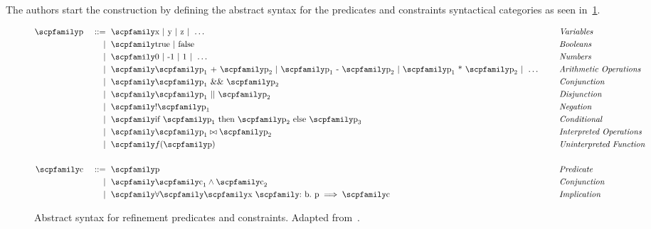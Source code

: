 \documentclass[
  oneside,
  english,
  coorientadorbanca,
  noabntexcite
]{ufsc-thesis-rn46-2019}
\def\bnfdef{::=}
\newcommand{\codett}[1]{\text{\scpfamily#1}}
\newcommand{\code}[1]{\text{\scpfamily\setlength\spaceskip{0.35em}#1}}
\newcommand{\bnfmore}[1]{            & \ & \mid{}    & \ \code{#1}}
\newcommand{\astprod}[2]{\code{#1} & \ & \bnfdef{} & \ \code{#2}}
\newcommand{\astmore}[1]{\bnfmore{#1}}
\newcommand{\typer}[2]{\code{#1 \codett{:} #2}}
\begin{document}
The authors start the construction by defining the abstract syntax for the predicates and constraints syntactical categories as seen in~\cref{fig:refinement_predicates}.
\begin{figure}[ht]
  \begin{minipage}{\textwidth}
    \begin{alignat*}{4}
      \astprod{p}{x $\mid$ y $\mid$ z $\mid\ \dots$} & \quad & \textit{Variables}              \\
      \astmore{true $\mid$ false}                    & \quad & \textit{Booleans}               \\
      \astmore{0 $\mid$ -1 $\mid$ 1 $\mid\ \dots$ }  & \quad & \textit{Numbers}                \\
      \astmore{%
        $\code{p}_1$ + $\code{p}_2$
        $\mid$ $\code{p}_1$ - $\code{p}_2$
        $\mid$ $\code{p}_1$ * $\code{p}_2$
        $\mid\ \dots$
      }                                              & \quad & \textit{Arithmetic Operations}  \\
      \astmore{$\code{p}_1$ \&\& $\code{p}_2$}       & \quad & \textit{Conjunction}            \\
      \astmore{$\code{p}_1$ || $\code{p}_2$}         & \quad & \textit{Disjunction}            \\
      \astmore{!$\code{p}_1$}                        & \quad & \textit{Negation}               \\
      \astmore{if $\code{p}_1$ then $\code{p}_2$ else $\code{p}_3$}
                                                     & \quad & \textit{Conditional}            \\
      \astmore{$\code{p}_1\bowtie\code{p}_2$}        & \quad & \textit{Interpreted Operations} \\
      \astmore{$f{(\code{p})}$}                      & \quad & \textit{Uninterpreted Function} \\
      \\
      \astprod{c}{p}                                 & \quad & \textit{Predicate}              \\
      \astmore{$\code{c}_1\land\code{c}_2$}          & \quad & \textit{Conjunction}            \\
      \astmore{$\forall\code{\typer{x}{b}.\ p}\implies\code{c}$ }
                                                     & \quad & \textit{Implication}            \\
    \end{alignat*}
  \end{minipage}
  \caption{
    Abstract syntax for refinement predicates and constraints.
    Adapted from~\cite{jhala2020tutorial}.
  }\label{fig:refinement_predicates}
\end{figure}
\end{document}
